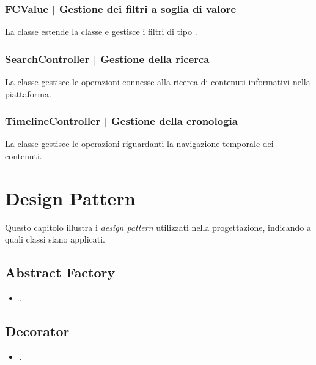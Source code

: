 \documentclass[10pt,a4paper,headinclude,footinclude,hidelinks]{scrreprt} %
\begin{document}
	\subsection[FCValue]{FCValue | Gestione dei filtri a soglia di valore}
	\label{sec:stage:design:controller:filter-value}
	La classe \textit{} estende la classe \textit{} e gestisce i filtri di tipo \textit{}.

	\subsection[SearchController]{SearchController | Gestione della ricerca}
	\label{sec:stage:design:controller:search}
	La classe \textit{} gestisce le operazioni connesse alla ricerca di contenuti informativi nella piattaforma.	

	\subsection[TimelineController]{TimelineController | Gestione della cronologia}
	\label{sec:stage:design:controller:timeline}
	La classe \textit{} gestisce le operazioni riguardanti la navigazione temporale dei contenuti.

	\chapter{Design Pattern}
	\label{ch:stage:design:pattern}
	Questo capitolo illustra i \textit{design pattern} utilizzati nella progettazione, indicando a quali classi siano applicati.

	\section{Abstract Factory}
	\label{sec:stage:design:pattern:factory}
	\begin{itemize}
	\item {}.
	\end{itemize}

	\section{Decorator}
	\label{sec:stage:design:pattern:decorator}
	\begin{itemize}
	\item {}.
	\end{itemize}
\end{document}
